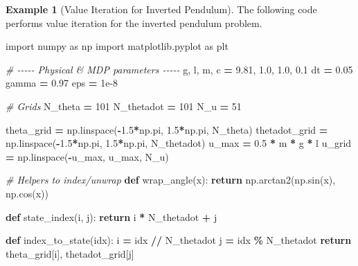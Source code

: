\documentclass[
]{book}
\newenvironment{Shaded}{\begin{snugshade}}{\end{snugshade}}
\newcommand{\CommentTok}[1]{\textcolor[rgb]{0.56,0.35,0.01}{\textit{#1}}}
\newcommand{\ControlFlowTok}[1]{\textcolor[rgb]{0.13,0.29,0.53}{\textbf{#1}}}
\newcommand{\DecValTok}[1]{\textcolor[rgb]{0.00,0.00,0.81}{#1}}
\newcommand{\FloatTok}[1]{\textcolor[rgb]{0.00,0.00,0.81}{#1}}
\newcommand{\ImportTok}[1]{#1}
\newcommand{\KeywordTok}[1]{\textcolor[rgb]{0.13,0.29,0.53}{\textbf{#1}}}
\newcommand{\NormalTok}[1]{#1}
\newcommand{\OperatorTok}[1]{\textcolor[rgb]{0.81,0.36,0.00}{\textbf{#1}}}
\theoremstyle{definition}
\theoremstyle{definition}
\newtheorem{example}{Example}[chapter]
\theoremstyle{definition}
\theoremstyle{definition}
\theoremstyle{remark}
\begin{document}
\begin{example}[Value Iteration for Inverted Pendulum]
\protect\hypertarget{exm:InvertedPendulumValueIteration}{}\label{exm:InvertedPendulumValueIteration}The following code performs value iteration for the inverted pendulum problem.

\begin{Shaded}
\begin{Highlighting}[]
\ImportTok{import}\NormalTok{ numpy }\ImportTok{as}\NormalTok{ np}
\ImportTok{import}\NormalTok{ matplotlib.pyplot }\ImportTok{as}\NormalTok{ plt}

\CommentTok{\# {-}{-}{-}{-}{-} Physical \& MDP parameters {-}{-}{-}{-}{-}}
\NormalTok{g, l, m, c }\OperatorTok{=} \FloatTok{9.81}\NormalTok{, }\FloatTok{1.0}\NormalTok{, }\FloatTok{1.0}\NormalTok{, }\FloatTok{0.1}
\NormalTok{dt }\OperatorTok{=} \FloatTok{0.05}
\NormalTok{gamma }\OperatorTok{=} \FloatTok{0.97}
\NormalTok{eps }\OperatorTok{=} \FloatTok{1e{-}8}

\CommentTok{\# Grids}
\NormalTok{N\_theta }\OperatorTok{=} \DecValTok{101}
\NormalTok{N\_thetadot }\OperatorTok{=} \DecValTok{101}
\NormalTok{N\_u }\OperatorTok{=} \DecValTok{51}

\NormalTok{theta\_grid }\OperatorTok{=}\NormalTok{ np.linspace(}\OperatorTok{{-}}\FloatTok{1.5}\OperatorTok{*}\NormalTok{np.pi, }\FloatTok{1.5}\OperatorTok{*}\NormalTok{np.pi, N\_theta)}
\NormalTok{thetadot\_grid }\OperatorTok{=}\NormalTok{ np.linspace(}\OperatorTok{{-}}\FloatTok{1.5}\OperatorTok{*}\NormalTok{np.pi, }\FloatTok{1.5}\OperatorTok{*}\NormalTok{np.pi, N\_thetadot)}
\NormalTok{u\_max }\OperatorTok{=} \FloatTok{0.5} \OperatorTok{*}\NormalTok{ m }\OperatorTok{*}\NormalTok{ g }\OperatorTok{*}\NormalTok{ l}
\NormalTok{u\_grid }\OperatorTok{=}\NormalTok{ np.linspace(}\OperatorTok{{-}}\NormalTok{u\_max, u\_max, N\_u)}

\CommentTok{\# Helpers to index/unwrap}
\KeywordTok{def}\NormalTok{ wrap\_angle(x):}
    \ControlFlowTok{return}\NormalTok{ np.arctan2(np.sin(x), np.cos(x))}

\KeywordTok{def}\NormalTok{ state\_index(i, j):}
    \ControlFlowTok{return}\NormalTok{ i }\OperatorTok{*}\NormalTok{ N\_thetadot }\OperatorTok{+}\NormalTok{ j}

\KeywordTok{def}\NormalTok{ index\_to\_state(idx):}
\NormalTok{    i }\OperatorTok{=}\NormalTok{ idx }\OperatorTok{//}\NormalTok{ N\_thetadot}
\NormalTok{    j }\OperatorTok{=}\NormalTok{ idx }\OperatorTok{\%}\NormalTok{ N\_thetadot}
    \ControlFlowTok{return}\NormalTok{ theta\_grid[i], thetadot\_grid[j]}


\end{Highlighting}
\end{Shaded}
\end{example}
\end{document}
